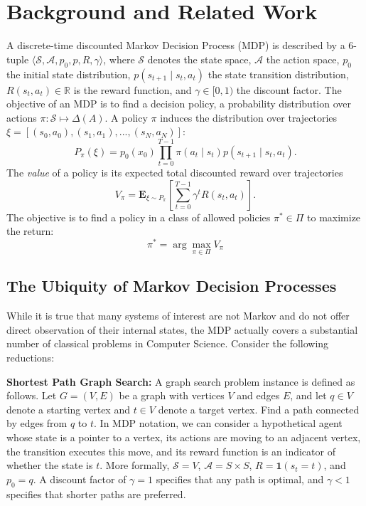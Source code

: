 \vspace{0.5em}

\section{Background and Related Work}
A discrete-time discounted Markov Decision Process (MDP) is described by a 6-tuple $\langle \mathcal{S}, \mathcal{A}, p_0, p, R, \gamma \rangle$, where $\mathcal{S}$ denotes the state space, $\mathcal{A}$ the action space, $p_0$ the initial state distribution, $p(s_{t+1} \mid s_{t}, a_{t})$ the state transition distribution, $R(s_t, a_t) \in \mathbb{R}$ is the reward function, and $\gamma \in [0,1)$ the discount factor. 
The objective of an MDP is to find a decision policy, a probability distribution over actions $\pi: \mathcal{S} \mapsto \Delta(A)$.
A policy $\pi$ induces the distribution over trajectories $\xi = [(s_0,a_0),(s_1,a_1),...,(s_N,a_N)]$:
\[
P_\pi(\xi) = p_0(x_0) \prod_{t=0}^{T-1} \pi(a_t \mid s_t) p(s_{t+1} \mid s_{t}, a_{t}).
\]
The \emph{value} of a policy is its expected total discounted reward over trajectories
\[
V_\pi = \mathbf{E}_{\xi \sim P_\pi}\left[\sum_{t=0}^{T-1} \gamma^t R(s_t,a_t)\right].
\]
The objective is to find a policy in a class of allowed policies $\pi^* \in \Pi$ to maximize the return:
\begin{equation}
\pi^* = \arg \max_{\pi \in \Pi} V_\pi 
\label{eq:main}
\end{equation}

\subsection{The Ubiquity of Markov Decision Processes}
While it is true that many systems of interest are not Markov and do not offer direct observation of their internal states, the MDP actually covers a substantial number of classical problems in Computer Science. Consider the following reductions:

\vspace{0.5em}\noindent \textbf{Shortest Path Graph Search: } A graph search problem instance is defined as follows. Let $G=(V,E)$ be a graph with vertices $V$ and edges $E$, and let $q \in V$ denote a starting vertex and $t \in V$ denote a target vertex. Find a path connected by edges from $q$ to $t$. In MDP notation, we can consider a hypothetical agent whose state is a pointer to a vertex, its actions are moving to an adjacent vertex, the transition executes this move, and its reward function is an indicator of whether the state is $t$. More formally, $\mathcal{S} = V$, $\mathcal{A} = S \times S$, $R = \mathbf{1}(s_t = t)$, and $p_0 = q$. A discount factor of $\gamma = 1$ specifies that any path is optimal, and $\gamma < 1$ specifies that shorter paths are preferred.

